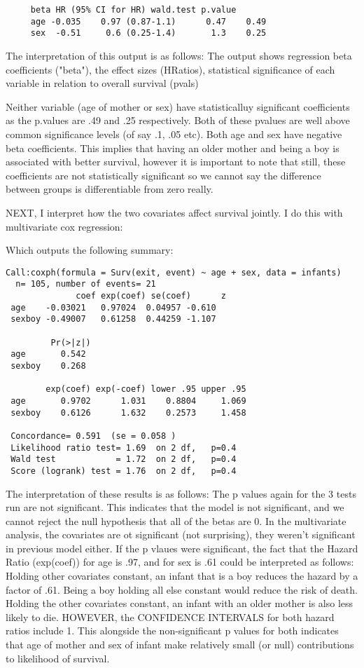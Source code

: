 \documentclass[12pt,letterpaper]{article}
\begin{document}
	\begin{verbatim}
     beta HR (95% CI for HR) wald.test p.value
     age -0.035    0.97 (0.87-1.1)      0.47    0.49
     sex  -0.51     0.6 (0.25-1.4)       1.3    0.25
\end{verbatim} 

The interpretation of this output is as follows: 
The output shows regression beta coefficients ("beta"), the effect sizes (HRatios), statistical significance of each variable in relation to overall survival (pvals)

Neither variable (age of mother or sex) have statisticalluy significant coefficients as the p.values are .49 and .25 respectively. Both of these pvalues are well above common significance levels (of say .1, .05 etc). Both age and sex have negative beta coefficients. This implies that having an older mother and being a boy is associated with better survival, however it is important to note that still, these coefficients are not statistically significant so we cannot say the difference between groups is differentiable from zero really.

NEXT, I interpret how the two covariates affect survival jointly. I do this with multivariate cox regression:
 

Which outputs the following summary:
	\begin{verbatim}
Call:coxph(formula = Surv(exit, event) ~ age + sex, data = infants)
  n= 105, number of events= 21
              coef exp(coef) se(coef)      z
 age    -0.03021   0.97024  0.04957 -0.610
 sexboy -0.49007   0.61258  0.44259 -1.107  
      
         Pr(>|z|)
 age       0.542
 sexboy    0.268
 
        exp(coef) exp(-coef) lower .95 upper .95
 age       0.9702      1.031    0.8804     1.069
 sexboy    0.6126      1.632    0.2573     1.458
 
 Concordance= 0.591  (se = 0.058 )
 Likelihood ratio test= 1.69  on 2 df,   p=0.4
 Wald test            = 1.72  on 2 df,   p=0.4
 Score (logrank) test = 1.76  on 2 df,   p=0.4
\end{verbatim} 

The interpretation of these results is as follows:
The p values again for the 3 tests run are not significant. This indicates that the model is not significant, and we cannot reject the null hypothesis that all of the betas are 0. 
In the multivariate analysis, the covariates are ot significant (not surprising), they weren't significant in previous model either. 
If the p vlaues were significant, the fact that the Hazard Ratio (exp(coef)) for age is .97, and for sex is .61 could be interpreted as follows: 
Holding other covariates constant, an infant that is a boy reduces the hazard by a factor of .61. Being a boy holding all else constant would reduce the risk of death.
Holding the other covariates constant, an infant with an older mother is also less likely to die. 
HOWEVER, the CONFIDENCE INTERVALS  for both hazard ratios include 1. This alongside the non-significant p values for both indicates that age of mother and sex of infant make relatively small (or null) contributions to likelihood of survival.
\end{document}
